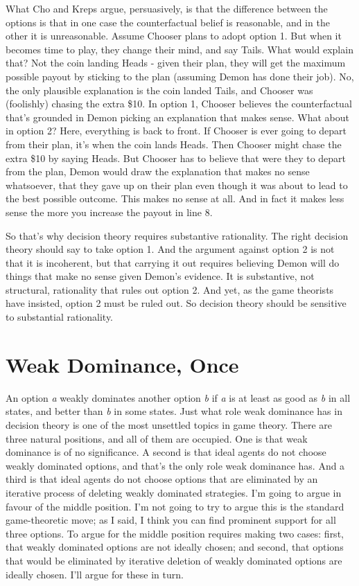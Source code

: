 \documentclass[
  12pt,
  letterpaper,
  DIV=11,
  numbers=noendperiod]{scrreprt}
\begin{document}
What Cho and Kreps argue, persuasively, is that the difference between
the options is that in one case the counterfactual belief is reasonable,
and in the other it is unreasonable. Assume Chooser plans to adopt
option 1. But when it becomes time to play, they change their mind, and
say Tails. What would explain that? Not the coin landing Heads - given
their plan, they will get the maximum possible payout by sticking to the
plan (assuming Demon has done their job). No, the only plausible
explanation is the coin landed Tails, and Chooser was (foolishly)
chasing the extra \$10. In option 1, Chooser believes the counterfactual
that's grounded in Demon picking an explanation that makes sense. What
about in option 2? Here, everything is back to front. If Chooser is ever
going to depart from their plan, it's when the coin lands Heads. Then
Chooser might chase the extra \$10 by saying Heads. But Chooser has to
believe that were they to depart from the plan, Demon would draw the
explanation that makes no sense whatsoever, that they gave up on their
plan even though it was about to lead to the best possible outcome. This
makes no sense at all. And in fact it makes less sense the more you
increase the payout in line 8.

So that's why decision theory requires substantive rationality. The
right decision theory should say to take option 1. And the argument
against option 2 is not that it is incoherent, but that carrying it out
requires believing Demon will do things that make no sense given Demon's
evidence. It is substantive, not structural, rationality that rules out
option 2. And yet, as the game theorists have insisted, option 2 must be
ruled out. So decision theory should be sensitive to substantial
rationality.


\chapter{Weak Dominance, Once}\label{sec-weak}

An option \emph{a} weakly dominates another option \emph{b} if \emph{a}
is at least as good as \emph{b} in all states, and better than \emph{b}
in some states. Just what role weak dominance has in decision theory is
one of the most unsettled topics in game theory. There are three natural
positions, and all of them are occupied. One is that weak dominance is
of no significance. A second is that ideal agents do not choose weakly
dominated options, and that's the only role weak dominance has. And a
third is that ideal agents do not choose options that are eliminated by
an iterative process of deleting weakly dominated strategies. I'm going
to argue in favour of the middle position. I'm not going to try to argue
this is the standard game-theoretic move; as I said, I think you can
find prominent support for all three options. To argue for the middle
position requires making two cases: first, that weakly dominated options
are not ideally chosen; and second, that options that would be
eliminated by iterative deletion of weakly dominated options are ideally
chosen. I'll argue for these in turn.
\end{document}
